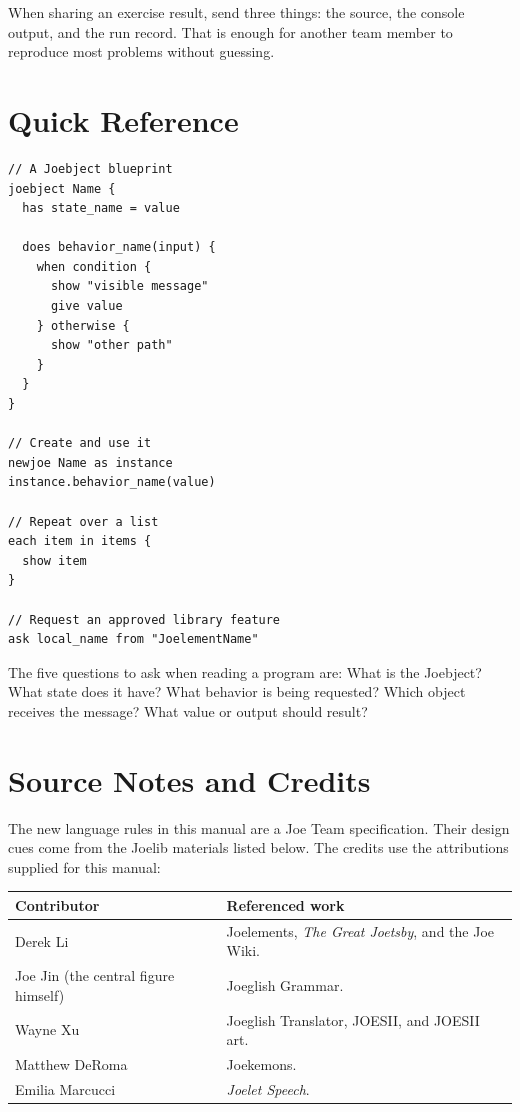 \documentclass[12pt]{article}
\begin{document}
When sharing an exercise result, send three things: the source, the console output, and the run record. That is enough for another team member to reproduce most problems without guessing.

\clearpage
\section{Quick Reference}
\begin{lstlisting}[style=joe]
// A Joebject blueprint
joebject Name {
  has state_name = value

  does behavior_name(input) {
    when condition {
      show "visible message"
      give value
    } otherwise {
      show "other path"
    }
  }
}

// Create and use it
newjoe Name as instance
instance.behavior_name(value)

// Repeat over a list
each item in items {
  show item
}

// Request an approved library feature
ask local_name from "JoelementName"
\end{lstlisting}

\begin{rulebox}
The five questions to ask when reading a program are: What is the Joebject? What state does it have? What behavior is being requested? Which object receives the message? What value or output should result?
\end{rulebox}

\clearpage
\section{Source Notes and Credits}
The new language rules in this manual are a Joe Team specification. Their design cues come from the Joelib materials listed below. The credits use the attributions supplied for this manual:

\begin{longtable}{p{}p{}}
\toprule
\textbf{Contributor} & \textbf{Referenced work}\\
\midrule
\endhead
Derek Li & Joelements, \emph{The Great Joetsby}, and the Joe Wiki.\\
Joe Jin (the central figure himself) & Joeglish Grammar.\\
Wayne Xu & Joeglish Translator, JOESII, and JOESII art.\\
Matthew DeRoma & Joekemons.\\
Emilia Marcucci & \emph{Joelet Speech}.\\
\bottomrule
\end{longtable}
\end{document}
